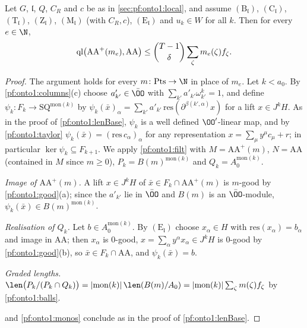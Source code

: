 \begin{theorem}\label{pf:onto1:lenPole}
Let $G$, $\mathfrak l$, $Q$, $C_R$ and $c$ be as in \cref{sec:pf:onto1:local}, and assume $(\mathrm B_{\mathfrak l})$, $(\mathrm C_{\mathfrak
l})$, $(\mathrm T_{\mathfrak l})$, $(\mathrm Z_{\mathfrak l})$, $(\mathrm M_{\mathfrak l})$ (with $C_R,c$), $(\mathrm E_{\mathfrak l})$ and $u_k\in W$
for all $k$. Then for every $e\in\N$,
\[
\operatorname{ql}\bigl(\mathrm{AA}^+(m_e),\mathrm{AA}\bigr)\le\binom{T-1}{\delta}\sum_{\zeta}m_e(\zeta)f_\zeta .
\]
\end{theorem}

\begin{proof}
The argument holds for every $m\colon\mathrm{Pts}\to\N$ in place of $m_e$. Let $k<a_0$. By \cref{pf:onto1:columns}(c) choose
$a'_{k'}\in\bar\OO$ with $\sum_{k'}a'_{k'}\omega_{k'}^k=1$, and define $\psi_k\colon F_k\to\mathrm{SQ}^{\mathrm{mon}(k)}$ by
$\psi_k(\bar x)_\alpha=\sum_{k'}a'_{k'}\,\mathrm{res}(\partial^{\beta(k',\alpha)}x)$ for a lift $x\in J^kH$. As in the proof of
\cref{pf:onto1:lenBase}, $\psi_k$ is a well defined $\OO'$-linear map, and by \cref{pf:onto1:taylor}
$\psi_k(\bar x)=(\mathrm{res}\,c_\alpha)_\alpha$ for any representation $x=\sum_\mu y^\mu c_\mu+r$; in particular $\ker\psi_k\subseteq
F_{k+1}$. We apply \cref{pf:onto1:filt} with $M=\mathrm{AA}^+(m)$, $N=\mathrm{AA}$ (contained in $M$ since $m\ge0$),
$P_k=B(m)^{\mathrm{mon}(k)}$ and $Q_k=A_0^{\mathrm{mon}(k)}$.

\emph{Image of $\mathrm{AA}^+(m)$.} A lift $x\in J^kH$ of $\bar x\in F_k\cap\mathrm{AA}^+(m)$ is $m$-good by \cref{pf:onto1:good}(a);
since the $a'_{k'}$ lie in $\bar\OO$ and $B(m)$ is an $\bar\OO$-module, $\psi_k(\bar x)\in B(m)^{\mathrm{mon}(k)}$.

\emph{Realisation of $Q_k$.} Let $b\in A_0^{\mathrm{mon}(k)}$. By $(\mathrm E_{\mathfrak l})$ choose $x_\alpha\in H$ with
$\mathrm{res}(x_\alpha)=b_\alpha$ and image in $\mathrm{AA}$; then $x_\alpha$ is $0$-good, $x=\sum_\alpha y^\alpha x_\alpha\in J^kH$ is
$0$-good by \cref{pf:onto1:good}(b), so $\bar x\in F_k\cap\mathrm{AA}$, and $\psi_k(\bar x)=b$.

\emph{Graded lengths.} $\len\bigl(P_k/(P_k\cap Q_k)\bigr)=|\mathrm{mon}(k)|\,\len(B(m)/A_0)=|\mathrm{mon}(k)|\sum_\zeta m(\zeta)f_\zeta$ by
\cref{pf:onto1:balls}.

 and \cref{pf:onto1:monos} conclude as in the proof of \cref{pf:onto1:lenBase}.
\end{proof}

